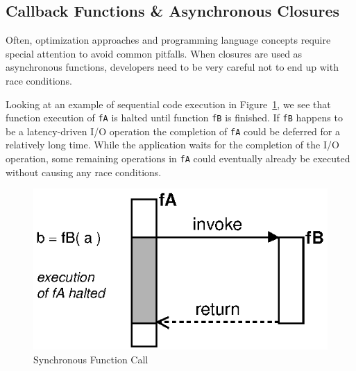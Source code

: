 


\subsection{Callback Functions \& Asynchronous Closures}

Often, optimization approaches and programming language concepts require special attention to avoid common pitfalls.
When closures are used as asynchronous functions, developers need to be very careful not to end up with race conditions.


Looking at an example of sequential code execution in Figure~\ref{fig:Closures_Synchronous}, we see that function execution of \texttt{fA} is halted until function \texttt{fB} is finished.
If \texttt{fB} happens to be a latency-driven I/O operation the completion of \texttt{fA} could be deferred for a relatively long time.
While the application waits for the completion of the I/O operation, some remaining operations in \texttt{fA} could eventually already be executed without causing any race conditions.
\begin{figure}[!ht]
	\centering
  \includegraphics{figures/Closures_Synchronous}
	\caption{Synchronous Function Call}
	\label{fig:Closures_Synchronous}
\end{figure}

